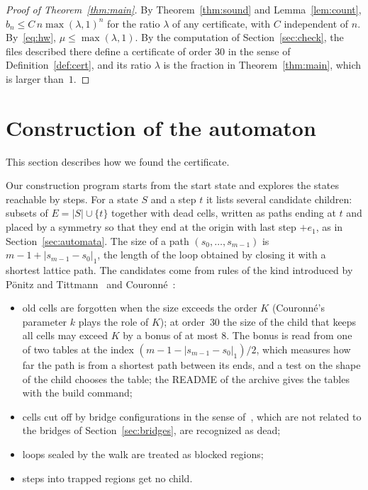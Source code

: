 \documentclass[11pt]{amsart}
\theoremstyle{definition}
\theoremstyle{remark}
\numberwithin{equation}{section}
\newcommand{\Kmax}{30}
\begin{document}
\begin{proof}[Proof of Theorem~\ref{thm:main}]
By Theorem~\ref{thm:sound} and Lemma~\ref{lem:count}, $b_n\le C\,n\max(\lambda,1)^n$ for the ratio $\lambda$ of any certificate, with $C$ independent of $n$. By~\eqref{eq:hw}, $\mu\le\max(\lambda,1)$. By the computation of Section~\ref{sec:check}, the files described there define a certificate of order $\Kmax$ in the sense of Definition~\ref{def:cert}, and its ratio $\lambda$ is the fraction in Theorem~\ref{thm:main}, which is larger than~$1$.
\end{proof}

\section{Construction of the automaton}\label{sec:build}

This section describes how we found the certificate.

Our construction program starts from the start state and explores the states reachable by steps. For a state $S$ and a step $t$ it lists several candidate children: subsets of $E=|S|\cup\{t\}$ together with dead cells, written as paths ending at $t$ and placed by a symmetry so that they end at the origin with last step $+e_1$, as in Section~\ref{sec:automata}. The size of a path $(s_0,\dots,s_{m-1})$ is $m-1+|s_{m-1}-s_0|_1$, the length of the loop obtained by closing it with a shortest lattice path. The candidates come from rules of the kind introduced by P\"onitz and Tittmann~\cite{PT00} and Couronn\'e~\cite{Cou25}:
\begin{itemize}[leftmargin=*]
\item old cells are forgotten when the size exceeds the order $K$ (Couronn\'e's parameter $k$ plays the role of $K$); at order~$\Kmax$ the size of the child that keeps all cells may exceed $K$ by a bonus of at most $8$. The bonus is read from one of two tables at the index $(m-1-|s_{m-1}-s_0|_1)/2$, which measures how far the path is from a shortest path between its ends, and a test on the shape of the child chooses the table; the README of the archive gives the tables with the build command;
\item cells cut off by bridge configurations in the sense of~\cite{Cou25}, which are not related to the bridges of Section~\ref{sec:bridges}, are recognized as dead;
\item loops sealed by the walk are treated as blocked regions;
\item steps into trapped regions get no child.
\end{itemize}
\end{document}
